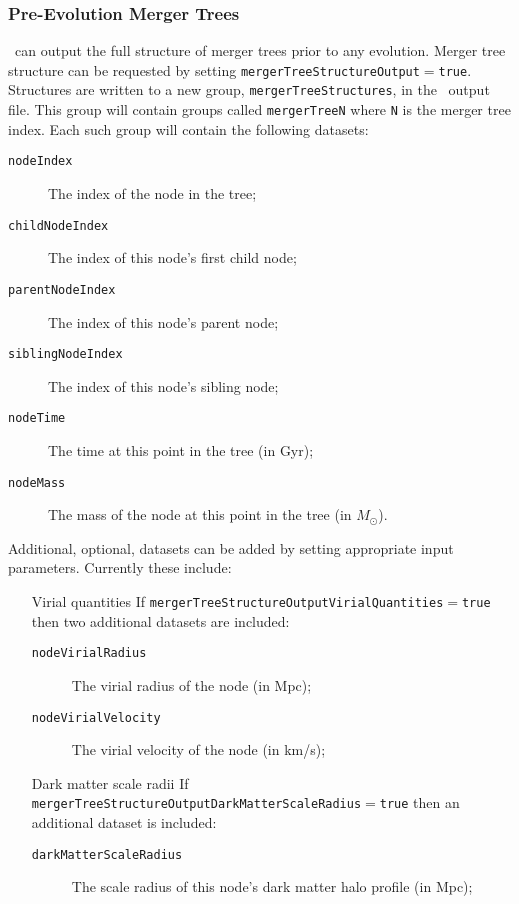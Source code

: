 \subsubsection{Pre-Evolution Merger Trees}

\glc\ can output the full structure of merger trees prior to any evolution. Merger tree structure can be requested by setting {\tt mergerTreeStructureOutput}$=${\tt true}. Structures are written to a new group, {\tt mergerTreeStructures}, in the \glc\ output file. This group will contain groups called {\tt mergerTreeN} where {\tt N} is the merger tree index. Each such group will contain the following datasets:
\begin{description}
 \item [{\tt nodeIndex}] The index of the node in the tree;
 \item [{\tt childNodeIndex}] The index of this node's first child node;
 \item [{\tt parentNodeIndex}] The index of this node's parent node;
 \item [{\tt siblingNodeIndex}] The index of this node's sibling node;
 \item [{\tt nodeTime}] The time at this point in the tree (in Gyr);
 \item [{\tt nodeMass}] The mass of the node at this point in the tree (in $M_\odot$).
\end{description}
Additional, optional, datasets can be added by setting appropriate input parameters. Currently these include:
\begin{itemize}
 \item [Virial quantities] If {\tt mergerTreeStructureOutputVirialQuantities}$=${\tt true} then two additional datasets are included:
 \begin{description}
  \item [{\tt nodeVirialRadius}] The virial radius of the node (in Mpc);
  \item [{\tt nodeVirialVelocity}] The virial velocity of the node (in km/s);
 \end{description}
 \item [Dark matter scale radii] If {\tt mergerTreeStructureOutputDarkMatterScaleRadius}$=${\tt true} then an additional dataset is included:
 \begin{description}
  \item [{\tt darkMatterScaleRadius}] The scale radius of this node's dark matter halo profile (in Mpc);
 \end{description}
\end{itemize}

